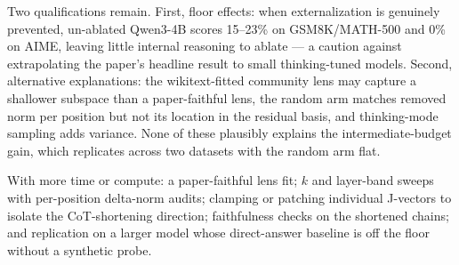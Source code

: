 \documentclass[9pt,twocolumn]{extarticle}
\begin{document}
Two qualifications remain. First, floor effects: when externalization is
genuinely prevented, un-ablated Qwen3-4B scores 15--23\% on GSM8K/MATH-500
and 0\% on AIME, leaving little internal reasoning to ablate --- a caution
against extrapolating the paper's headline result to small thinking-tuned
models. Second, alternative explanations: the wikitext-fitted community
lens may capture a shallower subspace than a paper-faithful lens, the
random arm matches removed norm per position but not its location in the
residual basis, and thinking-mode sampling adds variance. None of these
plausibly explains the intermediate-budget gain, which replicates across
two datasets with the random arm flat.

With more time or compute: a paper-faithful lens fit; $k$ and layer-band
sweeps with per-position delta-norm audits; clamping or patching individual
J-vectors to isolate the CoT-shortening direction; faithfulness checks on
the shortened chains; and replication on a larger model whose direct-answer
baseline is off the floor without a synthetic probe.
\end{document}
